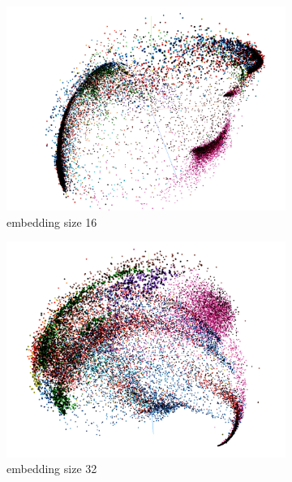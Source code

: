 \begin{figure}[t]
\centering
\begin{subfigure}{.33\linewidth}
  \centering
  \includegraphics[width=.9\linewidth]{study-doc/experiment_embedding_size/assets/embedding_space_16.png}
  \caption{embedding size 16}
  \label{fig:embedding-space-16}
\end{subfigure}%
\begin{subfigure}{.33\linewidth}
  \centering
  \includegraphics[width=.9\linewidth]{study-doc/experiment_embedding_size/assets/embedding_space_32.png}
  \caption{embedding size 32}
  \label{fig:embedding-space-32}
\end{subfigure}%
\begin{subfigure}{.33\linewidth}
  \centering

\end{subfigure}
\end{figure}

